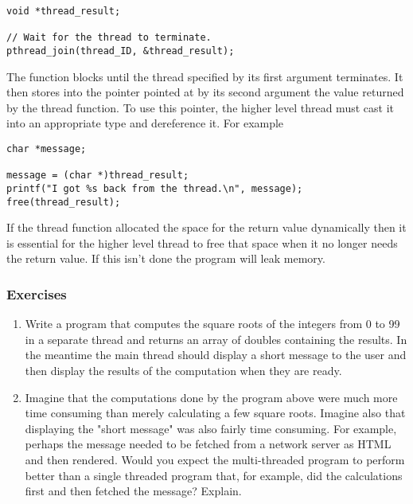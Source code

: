 \begin{lstlisting}
void *thread_result;

// Wait for the thread to terminate.
pthread_join(thread_ID, &thread_result);
\end{lstlisting}

The  function blocks until the thread specified by its first argument
terminates. It then stores into the pointer pointed at by its second argument the value returned
by the thread function. To use this pointer, the higher level thread must cast it into an
appropriate type and dereference it. For example

\begin{lstlisting}
char *message;

message = (char *)thread_result;
printf("I got %s back from the thread.\n", message);
free(thread_result);
\end{lstlisting}

If the thread function allocated the space for the return value dynamically then it is essential
for the higher level thread to free that space when it no longer needs the return value. If this
isn't done the program will leak memory.

\subsubsection*{Exercises}

\begin{enumerate}

\item Write a program that computes the square roots of the integers from 0 to 99 in a separate
  thread and returns an array of doubles containing the results. In the meantime the main thread
  should display a short message to the user and then display the results of the computation
  when they are ready.

\item Imagine that the computations done by the program above were much more time consuming than
  merely calculating a few square roots. Imagine also that displaying the "short message" was
  also fairly time consuming. For example, perhaps the message needed to be fetched from a
  network server as HTML and then rendered. Would you expect the multi-threaded program to
  perform better than a single threaded program that, for example, did the calculations first
  and then fetched the message? Explain.

\end{enumerate}

